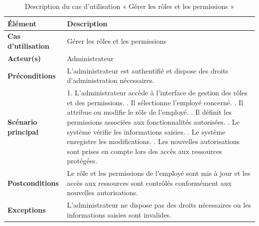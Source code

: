 \begin{longtable}{|>{\raggedright\arraybackslash}p{4cm}|>{\raggedright\arraybackslash}p{10.5cm}|}

\caption{Description du cas d’utilisation « Gérer les rôles et les permissions »}
\label{tab:uc5}\\

\hline

\textbf{Élément} & \textbf{Description} \\

\hline

\textbf{Cas d’utilisation} & Gérer les rôles et les permissions \\

\hline

\textbf{Acteur(s)} & Administrateur \\

\hline

\textbf{Préconditions} &
L'administrateur est authentifié et dispose des droits d'administration nécessaires. \\

\hline

\textbf{Scénario principal} &

1. L'administrateur accède à l'interface de gestion des rôles et des permissions. \newline
2. Il sélectionne l'employé concerné. \newline
3. Il attribue ou modifie le rôle de l'employé. \newline
4. Il définit les permissions associées aux fonctionnalités autorisées. \newline
5. Le système vérifie les informations saisies. \newline
6. Le système enregistre les modifications. \newline
7. Les nouvelles autorisations sont prises en compte lors des accès aux ressources protégées. \\

\hline

\textbf{Postconditions} &
Le rôle et les permissions de l'employé sont mis à jour et les accès aux ressources sont contrôlés conformément aux nouvelles autorisations. \\

\hline

\textbf{Exceptions} &
L'administrateur ne dispose pas des droits nécessaires ou les informations saisies sont invalides. \\

\hline

\end{longtable}



